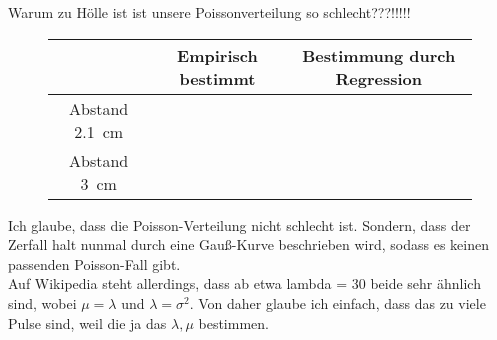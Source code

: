 Warum zu Hölle ist ist unsere Poissonverteilung so schlecht???!!!!!

      \begin{figure}[h!]
   	  	\centering
   	  	\begin{tabular}{c|c|c}
   	  		 & Empirisch bestimmt & Bestimmung durch Regression \\
   	  		\hline
   	  	Abstand \SI{2.1}{\centi\meter} &    &   \\
   	  	Abstand \SI{3}{\centi\meter} &   &  
   	  	\end{tabular}
   	  	\label{tab:energie_vergleich}
   	  \end{figure}

Ich glaube, dass die Poisson-Verteilung nicht schlecht ist. Sondern, dass der Zerfall halt nunmal durch eine Gauß-Kurve beschrieben wird, sodass es keinen passenden Poisson-Fall gibt. \\
Auf Wikipedia steht allerdings, dass ab etwa lambda = 30 beide sehr ähnlich sind, wobei $\mu = \lambda$ und $\lambda=\sigma^2$. Von daher glaube ich einfach, dass das zu viele Pulse sind, weil die ja das $\lambda,\mu$ bestimmen.
